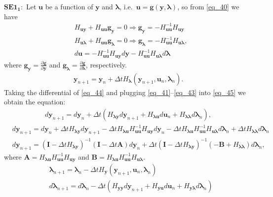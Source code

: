 \documentclass[a4paper, 10pt]{article}
\newcommand{\SEoo}{SE1_1}
\begin{document}
$\bm{\SEoo:}$
Let $\bm{u}$ be a function of $\bm{y}$ and $\bm{\lambda}$, i.e.\ $\bm{u} = \bm{g}(\bm{y},\bm{\lambda})$, so from \eqref{eq_40} we have
\begin{align}
    & H_{\bm{uy}} + H_{\bm{uu}}\bm{g_y} = 0 \Rightarrow \bm{g_y} = - H_{\bm{uu}}^{-1}H_{\bm{uy}}  \label{eq_41} \\
    & H_{\bm{u\lambda}} + H_{\bm{uu}}\bm{g_{\lambda}} = 0 \Rightarrow \bm{g_{\lambda}} = - H_{\bm{uu}}^{-1}H_{\bm{u\lambda}}, \label{eq_42} \\
    & d\bm{u} =  - H_{\bm{uu}}^{-1}H_{\bm{uy}} d\bm{y}  - H_{\bm{uu}}^{-1}H_{\bm{u\lambda}} d\bm{\lambda} \label{eq_43}
\end{align}
where $\bm{g_y} = \frac{\partial\bm{g}}{\partial\bm{y}}$ and $\bm{g_{\lambda}} = \frac{\partial\bm{g}}{\partial\bm{\lambda}}$, respectively.
\begin{align}
     \bm{y}_{n+1} = \bm{y}_n + \Delta{t} H_{\bm{\lambda}}(\bm{y}_{n+1},\bm{u}_n,\bm{\lambda}_n). \label{eq_44}
\end{align}
Taking the differential of \eqref{eq_44} and plugging \eqref{eq_41}--\eqref{eq_43} into \eqref{eq_45} we obtain the equation:
\begin{align}
    d\bm{y}_{n+1} = d\bm{y}_n + \Delta{t}(H_{\bm{\lambda y}}d\bm{y}_{n+1} + H_{\bm{\lambda u}}d\bm{u}_{n} + H_{\bm{\lambda \lambda}}d\bm{\lambda}_{n}), \label{eq_45}
\end{align}
\begin{align}
    &  d\bm{y}_{n+1} = d\bm{y}_n + \Delta{t}H_{\bm{\lambda y}}d\bm{y}_{n+1} -  \Delta{t} H_{\bm{\lambda u}}H_{\bm{uu}}^{-1}H_{\bm{uy}}d\bm{y}_n - \Delta{t} H_{\bm{\lambda u}} H_{\bm{uu}}^{-1}H_{\bm{u\lambda}}d\bm{\lambda}_n + \Delta{t} H_{\bm{\lambda \lambda}}d\bm{\lambda}_{n} \\
    & \boxed{d\bm{y}_{n+1} = (\bm{I} - \Delta{t}H_{\bm{\lambda y}})^{-1}(\bm{I} - \Delta{t}\bm{A}) d\bm{y}_n +\Delta{t}(\bm{I} - \Delta{t}H_{\bm{\lambda y}})^{-1}(-\bm{B} + H_{\bm{\lambda \lambda}})d\bm{\lambda}_{n}}, \label{eq_47}
\end{align}
where $\bm{A} = H_{\bm{\lambda u}}H_{\bm{uu}}^{-1}H_{\bm{uy}}$ and $\bm{B} = H_{\bm{\lambda u}} H_{\bm{uu}}^{-1}H_{\bm{u\lambda}}$.
\begin{align}
    & \bm{\lambda}_{n+1} = \bm{\lambda}_n - \Delta{t} H_{\bm{y}}(\bm{y}_{n+1},\bm{u}_n,\bm{\lambda}_n) \\
    & d\bm{\lambda}_{n+1} = d\bm{\lambda}_n - \Delta{t}(H_{\bm{yy}}d\bm{y}_{n+1} + H_{\bm{y u}}d\bm{u}_{n} + H_{\bm{y \lambda}}d\bm{\lambda}_{n}) \label{eq_49}
\end{align}
\end{document}
